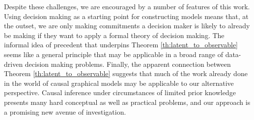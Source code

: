 Despite these challenges, we are encouraged by a number of features of this work. Using decision making as a starting point for constructing models means that, at the outset, we are only making commitments a decision maker is likely to already be making if they want to apply a formal theory of decision making. The informal idea of precedent that underpins Theorem \ref{th:latent_to_observable} seems like a general principle that may be applicable in a broad range of data-driven decision making problems. Finally, the apparent connection between Theorem \ref{th:latent_to_observable} suggests that much of the work already done in the world of causal graphical models may be applicable to our alternative perspective. Causal inference under circumstances of limited prior knowledge presents many hard conceptual as well as practical problems, and our approach is a promising new avenue of investigation.
